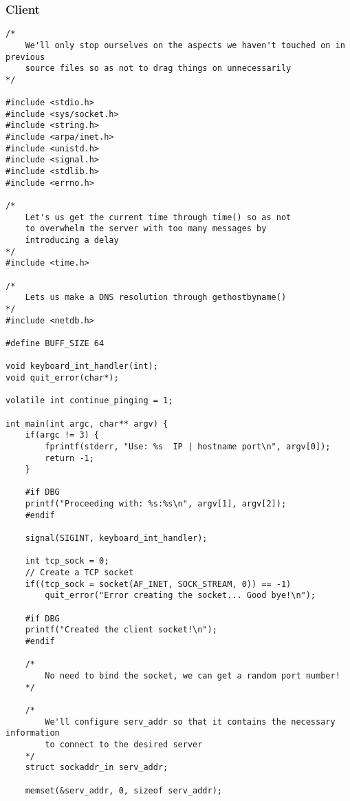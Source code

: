 \documentclass[landscape]{article}
\begin{document}
            \subsubsection{Client}
                \begin{verbatim}
/*
    We'll only stop ourselves on the aspects we haven't touched on in previous
    source files so as not to drag things on unnecessarily
*/

#include <stdio.h>
#include <sys/socket.h>
#include <string.h>
#include <arpa/inet.h>
#include <unistd.h>
#include <signal.h>
#include <stdlib.h>
#include <errno.h>

/*
    Let's us get the current time through time() so as not
    to overwhelm the server with too many messages by
    introducing a delay
*/
#include <time.h>

/*
    Lets us make a DNS resolution through gethostbyname()
*/
#include <netdb.h>

#define BUFF_SIZE 64

void keyboard_int_handler(int);
void quit_error(char*);

volatile int continue_pinging = 1;

int main(int argc, char** argv) {
    if(argc != 3) {
        fprintf(stderr, "Use: %s  IP | hostname port\n", argv[0]);
        return -1;
    }

    #if DBG
    printf("Proceeding with: %s:%s\n", argv[1], argv[2]);
    #endif

    signal(SIGINT, keyboard_int_handler);

    int tcp_sock = 0;
    // Create a TCP socket
    if((tcp_sock = socket(AF_INET, SOCK_STREAM, 0)) == -1)
        quit_error("Error creating the socket... Good bye!\n");

    #if DBG
    printf("Created the client socket!\n");
    #endif

    /*
        No need to bind the socket, we can get a random port number!
    */

    /*
        We'll configure serv_addr so that it contains the necessary information
        to connect to the desired server
    */
    struct sockaddr_in serv_addr;

    memset(&serv_addr, 0, sizeof serv_addr);


\end{verbatim}
\end{document}
